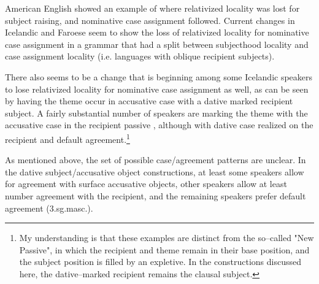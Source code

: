 American English showed an example of where relativized locality was lost for subject raising, and nominative case assignment followed. Current changes in Icelandic and Faroese seem to show the loss of relativized locality for nominative case assignment in a grammar that had a split between subjecthood locality and case assignment locality (i.e. languages with oblique recipient subjects).

There also seems to be a change that is beginning among some Icelandic speakers to lose relativized locality for nominative case assignment as well, as can be seen by having the theme occur in accusative case with a dative marked recipient subject. A fairly substantial number of speakers are marking the theme with the accusative case in the recipient passive \citep{Arnadottir.2013}, although with dative case realized on the recipient and default agreement.\footnote{My understanding is that these examples are distinct from the so--called "New Passive", in which the recipient and theme remain in their base position, and the subject position is filled by an expletive. In the constructions discussed here, the dative--marked recipient remains the clausal subject.}
\begin{exe}
\end{exe}
As mentioned above, the set of possible case/agreement patterns are unclear. In the dative subject/accusative object constructions, at least some speakers allow for agreement with surface accusative objects, other speakers allow at least number agreement with the recipient, and the remaining speakers prefer default agreement (3.sg.masc.). 

